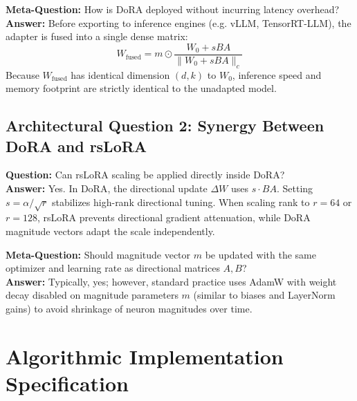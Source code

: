 \documentclass[11pt,a4paper]{article}
\theoremstyle{definition}
\begin{document}
\textbf{Meta-Question:} How is DoRA deployed without incurring latency overhead?\\
\textbf{Answer:} Before exporting to inference engines (e.g. vLLM, TensorRT-LLM), the adapter is fused into a single dense matrix:
{\boldmath
\begin{equation}
W_{\text{fused}} = m \odot \frac{W_0 + s BA}{\|W_0 + s BA\|_c}
\end{equation}
}
Because $W_{\text{fused}}$ has identical dimension $(d, k)$ to $W_0$, inference speed and memory footprint are strictly identical to the unadapted model.

\subsection{Architectural Question 2: Synergy Between DoRA and rsLoRA}
\textbf{Question:} Can rsLoRA scaling be applied directly inside DoRA?\\
\textbf{Answer:} Yes. In DoRA, the directional update $\Delta W$ uses $s \cdot BA$. Setting $s = \alpha / \sqrt{r}$ stabilizes high-rank directional tuning. When scaling rank to $r = 64$ or $r = 128$, rsLoRA prevents directional gradient attenuation, while DoRA magnitude vectors adapt the scale independently.

\textbf{Meta-Question:} Should magnitude vector $m$ be updated with the same optimizer and learning rate as directional matrices $A, B$?\\
\textbf{Answer:} Typically, yes; however, standard practice uses AdamW with weight decay disabled on magnitude parameters $m$ (similar to biases and LayerNorm gains) to avoid shrinkage of neuron magnitudes over time.

\section{Algorithmic Implementation Specification}
\end{document}

